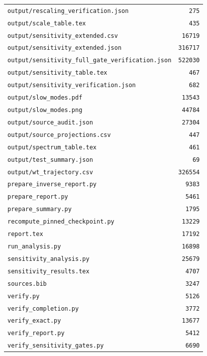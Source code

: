 \begin{longtable}{p{.78\linewidth}r}
\nolinkurl{output/rescaling_verification.json} & \texttt{275} \\
\nolinkurl{output/scale_table.tex} & \texttt{435} \\
\nolinkurl{output/sensitivity_extended.csv} & \texttt{16719} \\
\nolinkurl{output/sensitivity_extended.json} & \texttt{316717} \\
\nolinkurl{output/sensitivity_full_gate_verification.json} & \texttt{522030} \\
\nolinkurl{output/sensitivity_table.tex} & \texttt{467} \\
\nolinkurl{output/sensitivity_verification.json} & \texttt{682} \\
\nolinkurl{output/slow_modes.pdf} & \texttt{13543} \\
\nolinkurl{output/slow_modes.png} & \texttt{44784} \\
\nolinkurl{output/source_audit.json} & \texttt{27304} \\
\nolinkurl{output/source_projections.csv} & \texttt{447} \\
\nolinkurl{output/spectrum_table.tex} & \texttt{461} \\
\nolinkurl{output/test_summary.json} & \texttt{69} \\
\nolinkurl{output/wt_trajectory.csv} & \texttt{326554} \\
\nolinkurl{prepare_inverse_report.py} & \texttt{9383} \\
\nolinkurl{prepare_report.py} & \texttt{5461} \\
\nolinkurl{prepare_summary.py} & \texttt{1795} \\
\nolinkurl{recompute_pinned_checkpoint.py} & \texttt{13229} \\
\nolinkurl{report.tex} & \texttt{17192} \\
\nolinkurl{run_analysis.py} & \texttt{16898} \\
\nolinkurl{sensitivity_analysis.py} & \texttt{25679} \\
\nolinkurl{sensitivity_results.tex} & \texttt{4707} \\
\nolinkurl{sources.bib} & \texttt{3247} \\
\nolinkurl{verify.py} & \texttt{5126} \\
\nolinkurl{verify_completion.py} & \texttt{3772} \\
\nolinkurl{verify_exact.py} & \texttt{13677} \\
\nolinkurl{verify_report.py} & \texttt{5412} \\
\nolinkurl{verify_sensitivity_gates.py} & \texttt{6690} \\
\end{longtable}
\endgroup
